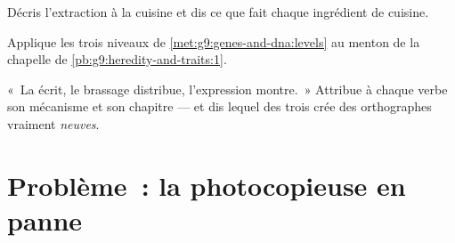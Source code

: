 \begin{exercise}[$\star\star$]\label{exo:g9:genes-and-dna:10}
Décris l'extraction à la cuisine et dis ce que fait chaque
ingrédient de cuisine.
\end{exercise}

\begin{exercise}[$\star\star$]\label{exo:g9:genes-and-dna:11}
Applique les trois niveaux de
\cref{met:g9:genes-and-dna:levels} au menton de la chapelle
de \cref{pb:g9:heredity-and-traits:1}.
\end{exercise}

\begin{exercise}[$\star\star\star$]\label{exo:g9:genes-and-dna:12}
«~La  écrit, le brassage distribue, l'expression
montre.~» Attribue à chaque verbe son mécanisme et son
chapitre --- et dis lequel des trois crée des orthographes
vraiment \emph{neuves}.
\end{exercise}

\section{Problème~: la photocopieuse en panne}

